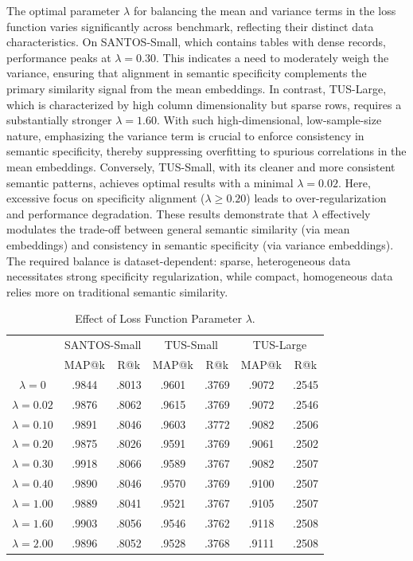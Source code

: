 The optimal parameter $\lambda$ for balancing the mean and variance terms in the loss function varies significantly across benchmark, reflecting their distinct data characteristics. On SANTOS-Small, which contains tables with dense records, performance peaks at $\lambda=0.30$. This indicates a need to moderately weigh the variance, ensuring that alignment in semantic specificity complements the primary similarity signal from the mean embeddings. In contrast, TUS-Large, which is characterized by high column dimensionality but sparse rows, requires a substantially stronger $\lambda=1.60$. With such high-dimensional, low-sample-size nature, emphasizing the variance term is crucial to enforce consistency in semantic specificity, thereby suppressing overfitting to spurious correlations in the mean embeddings. Conversely, TUS-Small, with its cleaner and more consistent semantic patterns, achieves optimal results with a minimal $\lambda=0.02$. Here, excessive focus on specificity alignment ($\lambda\geq 0.20$) leads to over-regularization and performance degradation. These results demonstrate that $\lambda$ effectively modulates the trade-off between general semantic similarity (via mean embeddings) and consistency in semantic specificity (via variance embeddings). The required balance is dataset-dependent: sparse, heterogeneous data necessitates strong specificity regularization, while compact, homogeneous data relies more on traditional semantic similarity.

\begin{table}[t]
  \centering
  \caption{Effect of Loss Function Parameter $\lambda$.}
  \label{eff_lam}
  \begin{tabular}{c|cc|cc|cc}
    \toprule 
    {\multirow{2}{*}{$\lambda$}}&\multicolumn{2}{c|}{SANTOS-Small}&\multicolumn{2}{c|}{TUS-Small}&\multicolumn{2}{c}{TUS-Large}\\
    &MAP@k&R@k&MAP@k&R@k&MAP@k&R@k\\
    \midrule
    $\lambda=0$&.9844&.8013&.9601&.3769&.9072&.2545\\
    $\lambda=0.02$&.9876&.8062&.9615&.3769&.9072&.2546\\
    $\lambda=0.10$&.9891&.8046&.9603&.3772&.9082&.2506\\
    $\lambda=0.20$&.9875&.8026&.9591&.3769&.9061&.2502\\
    $\lambda=0.30$&.9918&.8066&.9589&.3767&.9082&.2507\\
    $\lambda=0.40$&.9890&.8046&.9570&.3769&.9100&.2507\\
    $\lambda=1.00$&.9889&.8041&.9521&.3767&.9105&.2507\\
    $\lambda=1.60$&.9903&.8056&.9546&.3762&.9118&.2508\\
    $\lambda=2.00$&.9896&.8052&.9528&.3768&.9111&.2508\\
  \bottomrule
\end{tabular}
\end{table}
\fi
